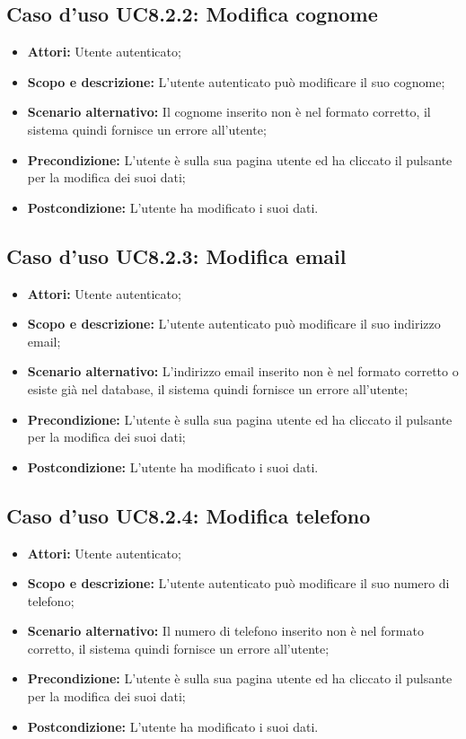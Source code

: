 \documentclass[12pt,a4paper,titlepage]{article}
\begin{document}
	\subsection{Caso d'uso UC8.2.2: Modifica cognome}
	\label{UC8.2.2}
	\begin{itemize}
		\item \textbf{Attori: }Utente autenticato;
		\item \textbf{Scopo e descrizione: }L'utente autenticato può modificare il suo cognome;
		\item \textbf{Scenario alternativo: }Il cognome inserito non è nel formato corretto, il sistema quindi fornisce un errore all'utente;
		\item \textbf{Precondizione: }L'utente è sulla sua pagina utente ed ha cliccato il pulsante per la modifica dei suoi dati;
		\item \textbf{Postcondizione: }L'utente ha modificato i suoi dati.
	\end{itemize}
	\subsection{Caso d'uso UC8.2.3: Modifica email}
	\label{UC8.2.3}
	\begin{itemize}
		\item \textbf{Attori: }Utente autenticato;
		\item \textbf{Scopo e descrizione: }L'utente autenticato può modificare il suo indirizzo email;
		\item \textbf{Scenario alternativo: }L'indirizzo email inserito non è nel formato corretto o esiste già nel database, il sistema quindi fornisce un errore all'utente;
		\item \textbf{Precondizione: }L'utente è sulla sua pagina utente ed ha cliccato il pulsante per la modifica dei suoi dati;
		\item \textbf{Postcondizione: }L'utente ha modificato i suoi dati.
	\end{itemize}
	\subsection{Caso d'uso UC8.2.4: Modifica telefono}
	\label{UC8.2.4}
	\begin{itemize}
		\item \textbf{Attori: }Utente autenticato;
		\item \textbf{Scopo e descrizione: }L'utente autenticato può modificare il suo numero di telefono;
		\item \textbf{Scenario alternativo: }Il numero di telefono inserito non è nel formato corretto, il sistema quindi fornisce un errore all'utente;
		\item \textbf{Precondizione: }L'utente è sulla sua pagina utente ed ha cliccato il pulsante per la modifica dei suoi dati;
		\item \textbf{Postcondizione: }L'utente ha modificato i suoi dati.
	\end{itemize}
\end{document}
